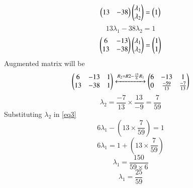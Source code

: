 \documentclass[journal,12pt,twocolumn]{IEEEtran}
\begin{document}
\begin{equation}
    \begin{pmatrix}13 & -38\end{pmatrix}\begin{pmatrix}\lambda{_1}\\\lambda{_2}\end{pmatrix} = \begin{pmatrix}1\end{pmatrix}
\end{equation}
\begin{equation}
    13\lambda{_1} - 38\lambda{_2} = 1
\end{equation}
\begin{equation}
    \begin{pmatrix}6 & -13\\13 & -38\end{pmatrix}\begin{pmatrix}\lambda{_1}\\\lambda{_2}\end{pmatrix} = \begin{pmatrix}1\\1\end{pmatrix} 
\end{equation}
Augmented matrix will be
\begin{equation}
    \begin{pmatrix}6 & -13 & 1\\13 & -38 & 1\end{pmatrix}\xleftrightarrow[]{R_2 = R2 - \frac{13}{6}R_1}\begin{pmatrix}6 & -13 & 1\\0 & \frac{-59}{13} & \frac{-7}{13}\end{pmatrix}
\end{equation}
\begin{equation}
    \lambda{_2} = \frac{-7}{13} \times \frac{13}{-9}  = \frac{7}{59}
\end{equation}
Substituting $\lambda{_2}$ in \eqref{eq3}
\begin{equation}
    6\lambda{_1} - \left(13 \times \frac{7}{59}\right) = 1
\end{equation}
\begin{equation}
    6\lambda{_1} = 1 + \left(13 \times \frac{7}{59}\right)
\end{equation}
\begin{equation}
    \lambda{_1} = \frac{150}{59 \times 6}
\end{equation}
\begin{equation}
    \lambda{_1} = \frac{25}{59}
\end{equation}
\end{document}
